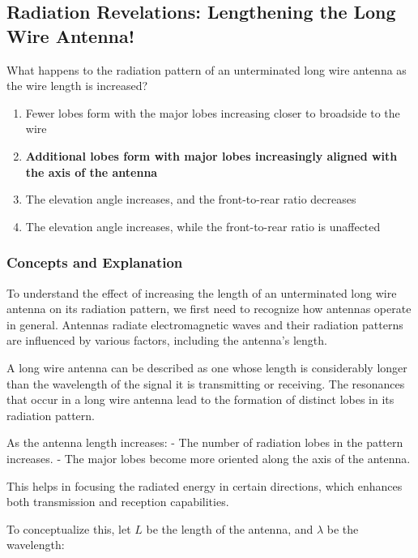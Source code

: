 \subsection{Radiation Revelations: Lengthening the Long Wire Antenna!}

\begin{tcolorbox}[colback=gray!10, colframe=black, title=E9C04] What happens to the radiation pattern of an unterminated long wire antenna as the wire length is increased? 
\begin{enumerate}[label=\Alph*.]
    \item Fewer lobes form with the major lobes increasing closer to broadside to the wire
    \item \textbf{Additional lobes form with major lobes increasingly aligned with the axis of the antenna}
    \item The elevation angle increases, and the front-to-rear ratio decreases
    \item The elevation angle increases, while the front-to-rear ratio is unaffected
\end{enumerate} \end{tcolorbox}

\subsubsection{Concepts and Explanation}

To understand the effect of increasing the length of an unterminated long wire antenna on its radiation pattern, we first need to recognize how antennas operate in general. Antennas radiate electromagnetic waves and their radiation patterns are influenced by various factors, including the antenna's length.

A long wire antenna can be described as one whose length is considerably longer than the wavelength of the signal it is transmitting or receiving. The resonances that occur in a long wire antenna lead to the formation of distinct lobes in its radiation pattern. 

As the antenna length increases:
- The number of radiation lobes in the pattern increases.
- The major lobes become more oriented along the axis of the antenna.

This helps in focusing the radiated energy in certain directions, which enhances both transmission and reception capabilities. 

To conceptualize this, let $L$ be the length of the antenna, and $\lambda$ be the wavelength:

